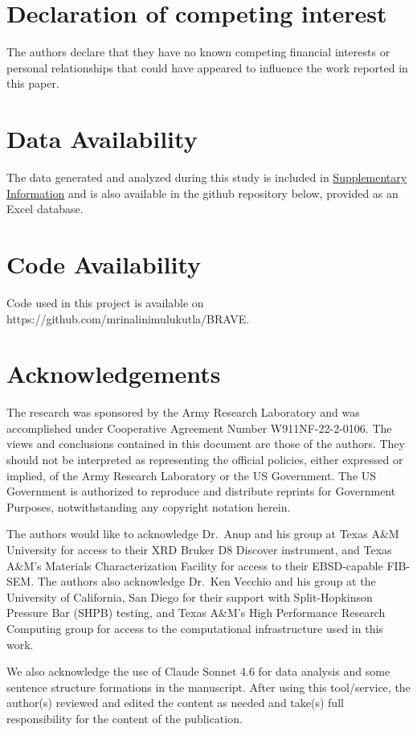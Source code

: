 \documentclass[final,5p,times,twocolumn]{elsarticle}
\begin{document}









\section*{Declaration of competing interest}

    The authors declare that they have no known competing financial interests or personal relationships that could have appeared to influence the work reported in this paper.

\section*{Data Availability}

    The data generated and analyzed during this study is included in \underline{Supplementary Information} and is also available in the github repository below, provided as an Excel database.

\section*{Code Availability}

    Code used in this project is available on https://github.com/mrinalinimulukutla/BRAVE.

\section{Acknowledgements}

The research was sponsored by the Army Research Laboratory and was accomplished under Cooperative Agreement Number W911NF-22-2-0106. The views and conclusions contained in this document are those of the authors. They should not be interpreted as representing the official policies, either expressed or implied, of the Army Research Laboratory or the US Government. The US Government is authorized to reproduce and distribute reprints for Government Purposes, notwithstanding any copyright notation herein. 
    
The authors would like to acknowledge Dr.\ Anup and his group at Texas A\&M University for access to their XRD Bruker D8 Discover instrument, and Texas A\&M's Materials Characterization Facility for access to their EBSD-capable FIB-SEM. The authors also acknowledge Dr.\ Ken Vecchio and his group at the University of California, San Diego for their support with Split-Hopkinson Pressure Bar (SHPB) testing, and Texas A\&M's High Performance Research Computing group for access to the computational infrastructure used in this work.


We also acknowledge the use of Claude Sonnet 4.6 for data analysis and some sentence structure formations in the manuscript. After using this tool/service, the author(s) reviewed and edited the content as needed and take(s) full responsibility for the content of the publication.  

%




\end{document}
